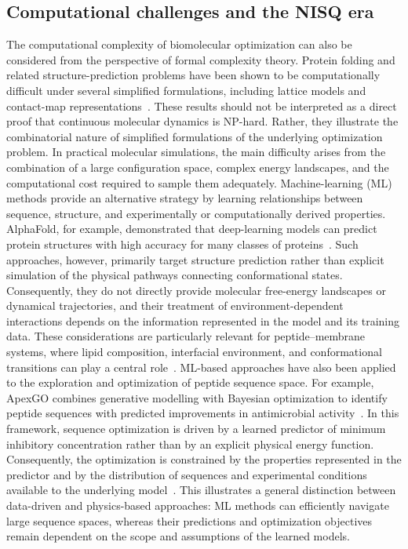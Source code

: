 \subsection{Computational challenges and the NISQ era}
The computational complexity of biomolecular optimization can also be considered from the perspective of formal complexity theory. Protein folding and related structure-prediction problems have been shown to be computationally difficult under several simplified formulations, including lattice models and contact-map representations~\cite{robert2021resource}. These results should not be interpreted as a direct proof that continuous molecular dynamics is NP-hard. Rather, they illustrate the combinatorial nature of simplified formulations of the underlying optimization problem. In practical molecular simulations, the main difficulty arises from the combination of a large configuration space, complex energy landscapes, and the computational cost required to sample them adequately.
Machine-learning (ML) methods provide an alternative strategy by learning relationships between sequence, structure, and experimentally or computationally derived properties. AlphaFold, for example, demonstrated that deep-learning models can predict protein structures with high accuracy for many classes of proteins~\cite{Jumper2021}. Such approaches, however, primarily target structure prediction rather than explicit simulation of the physical pathways connecting conformational states. Consequently, they do not directly provide molecular free-energy landscapes or dynamical trajectories, and their treatment of environment-dependent interactions depends on the information represented in the model and its training data. These considerations are particularly relevant for peptide--membrane systems, where lipid composition, interfacial environment, and conformational transitions can play a central role~\cite{PROTEINMPNN,ROSETTA,Goverde2024,dolorfino2024,platform_ia_2,articulo_limitacion_ia}.
ML-based approaches have also been applied to the exploration and optimization of peptide sequence space. For example, ApexGO combines generative modelling with Bayesian optimization to identify peptide sequences with predicted improvements in antimicrobial activity~\cite{Torres2026}. In this framework, sequence optimization is driven by a learned predictor of minimum inhibitory concentration rather than by an explicit physical energy function. Consequently, the optimization is constrained by the properties represented in the predictor and by the distribution of sequences and experimental conditions available to the underlying model~\cite{Torres2026}. This illustrates a general distinction between data-driven and physics-based approaches: ML methods can efficiently navigate large sequence spaces, whereas their predictions and optimization objectives remain dependent on the scope and assumptions of the learned models.
